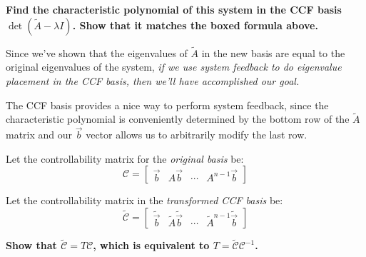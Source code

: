 \begin{enumerate}
\textbf{Find the characteristic polynomial of this system in the CCF basis $\operatorname{det}(\widetilde{A} - \lambda I)$. Show that it matches the boxed formula above.}

\ws{\vspace{100px}}

\qitem Since we've shown that the eigenvalues of $\widetilde{A}$ in the new basis are equal to the original eigenvalues of the system, \textit{if we use system feedback to do eigenvalue placement in the CCF basis, then we'll have accomplished our goal.}

The CCF basis provides a nice way to perform system feedback, since the characteristic polynomial is conveniently determined by the bottom row of the $\widetilde{A}$ matrix and our $\vec{b}$ vector allows us to arbitrarily modify the last row.

Let the controllability matrix for the \textit{original basis} be:
$$\mathcal{C} = \begin{bmatrix} \vec{b} & A\vec{b} & \cdots & A^{n-1}\vec{b} \end{bmatrix}$$

Let the controllability matrix in the \textit{transformed CCF basis} be:
$$\widetilde{\mathcal{C}} = \begin{bmatrix}
\widetilde{\vec{b}} & \widetilde{A}\widetilde{\vec{b}} & \cdots & \widetilde{A}^{n-1}\widetilde{\vec{b}}
\end{bmatrix}$$

\textbf{Show that $\widetilde{\mathcal{C}} = T\mathcal{C}$, which is equivalent to $T = \widetilde{\mathcal{C}}\mathcal{C}^{-1}$.}


\end{enumerate}
